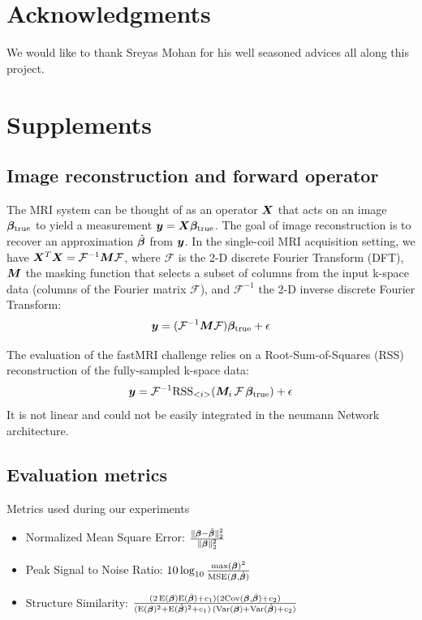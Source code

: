 \documentclass{article}
\begin{document}
\section{Acknowledgments}
We would like to thank Sreyas Mohan for his well seasoned advices all along this project.

\nocite{*}



\section{Supplements}
\subsection{Image reconstruction and forward operator}
The MRI system can be thought of as an operator $\bm{X}$ that acts on an image $\bm{\beta}_{\text{true}}$ to yield a measurement $\bm{y}= \bm{X} \bm{\beta}_{\text{true}}$.
The goal of image reconstruction is to recover an approximation $\hat{\bm{\beta}}$ from $\bm{y}$.
In the single-coil MRI acquisition setting, we have $\bm{X}^T \bm{X} = \mathcal{F}^{-1} \bm{M} \mathcal{F}$, where $\mathcal{F}$ is the 2-D discrete Fourier Transform (DFT), $\bm{M}$ the masking function that selects a subset of columns from the input k-space data (columns of the Fourier matrix  $\mathcal{F}$), and $\mathcal{F}^{-1}$ the 2-D inverse discrete Fourier Transform:
$$
	\bm{y}	= (\mathcal{F}^{-1} \bm{M} \mathcal{F}) \bm{\beta}_{\text{true}} + \epsilon			
$$
 
The evaluation of the fastMRI challenge relies on a Root-Sum-of-Squares (RSS) reconstruction of the fully-sampled k-space data:
$$
	\bm{y}	= \mathcal{F}^{-1} \text{RSS}_{<i>} (\bm{M}_i \, \mathcal{F} \, \bm{\beta}_{\text{true}}) + \epsilon			
$$
It is not linear and could not be easily integrated in the neumann Network architecture.
 
\subsection{Evaluation metrics}
Metrics used during our experiments
\begin{itemize}
	\item Normalized Mean Square Error: $\frac{ \| \bm{\beta} - \hat{\bm{\beta}} \|_2^2 } { \|  \bm{\beta} \|_2^2 }$
	\item Peak Signal to Noise Ratio: $10 \log_{10} \frac {\max({\bm{\beta}})^2 } {\mathrm{MSE} (\bm{\beta}, \hat{\bm{\beta}})}$
	\item Structure Similarity: $\frac{ ( 2 \, \mathrm{E}(\bm{\beta})  \mathrm{E}( \hat{\bm{\beta}}) + c_1) (2 \mathrm{Cov}(\bm{\beta},  \hat{\bm{\beta}}) + c_2) } { (\mathrm{E}(\bm{\beta})^2 +  \mathrm{E}( \hat{\bm{\beta}})^2 + c_1) \, (\mathrm{Var}(\bm{\beta}) +  \mathrm{Var}( \hat{\bm{\beta}}) + c_2) }$
\end{itemize}
\end{document}
